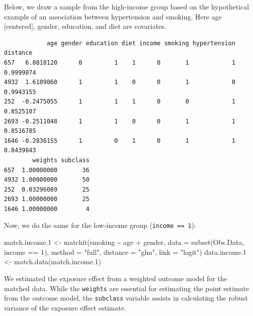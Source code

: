 \documentclass[
  letterpaper,
  DIV=11,
  numbers=noendperiod]{scrreprt}
\newenvironment{Shaded}{\begin{snugshade}}{\end{snugshade}}
\newcommand{\AttributeTok}[1]{\textcolor[rgb]{0.40,0.45,0.13}{#1}}
\newcommand{\DecValTok}[1]{\textcolor[rgb]{0.68,0.00,0.00}{#1}}
\newcommand{\FloatTok}[1]{\textcolor[rgb]{0.68,0.00,0.00}{#1}}
\newcommand{\FunctionTok}[1]{\textcolor[rgb]{0.28,0.35,0.67}{#1}}
\newcommand{\NormalTok}[1]{\textcolor[rgb]{0.00,0.23,0.31}{#1}}
\newcommand{\OtherTok}[1]{\textcolor[rgb]{0.00,0.23,0.31}{#1}}
\newcommand{\SpecialCharTok}[1]{\textcolor[rgb]{0.37,0.37,0.37}{#1}}
\newcommand{\StringTok}[1]{\textcolor[rgb]{0.13,0.47,0.30}{#1}}
\begin{document}
Below, we draw a sample from the high-income group based on the
hypothetical example of an association between hypertension and smoking.
Here age {[}centered{]}, gender, education, and diet are covariates.

\begin{verbatim}
            age gender education diet income smoking hypertension  distance
657   6.0810120      0         1    1      0       1            1 0.9999874
4932  1.6109860      1         1    0      0       1            0 0.9943155
252  -0.2475055      1         1    1      0       0            1 0.8525107
2693 -0.2511048      1         1    0      0       1            1 0.8516785
1646 -0.2836155      1         0    1      0       1            1 0.8439843
        weights subclass
657  1.00000000       36
4932 1.00000000       50
252  0.03296089       25
2693 1.00000000       25
1646 1.00000000        4
\end{verbatim}

Now, we do the same for the low-income group (\texttt{income\ ==\ 1}):

\begin{Shaded}
\begin{Highlighting}[]
\NormalTok{match.income}\FloatTok{.1} \OtherTok{\textless{}{-}} \FunctionTok{matchit}\NormalTok{(smoking }\SpecialCharTok{\textasciitilde{}}\NormalTok{ age }\SpecialCharTok{+}\NormalTok{ gender, }
                          \AttributeTok{data =} \FunctionTok{subset}\NormalTok{(Obs.Data, income }\SpecialCharTok{==} \DecValTok{1}\NormalTok{),}
                          \AttributeTok{method =} \StringTok{"full"}\NormalTok{, }\AttributeTok{distance =} \StringTok{"glm"}\NormalTok{, }\AttributeTok{link =} \StringTok{"logit"}\NormalTok{)}
\NormalTok{data.income}\FloatTok{.1} \OtherTok{\textless{}{-}} \FunctionTok{match.data}\NormalTok{(match.income}\FloatTok{.1}\NormalTok{)}
\end{Highlighting}
\end{Shaded}

We estimated the exposure effect from a weighted outcome model for the
matched data. While the \texttt{weights} are essential for estimating
the point estimate from the outcome model, the \texttt{subclass}
variable assists in calculating the robust variance of the exposure
effect estimate.
\end{document}

